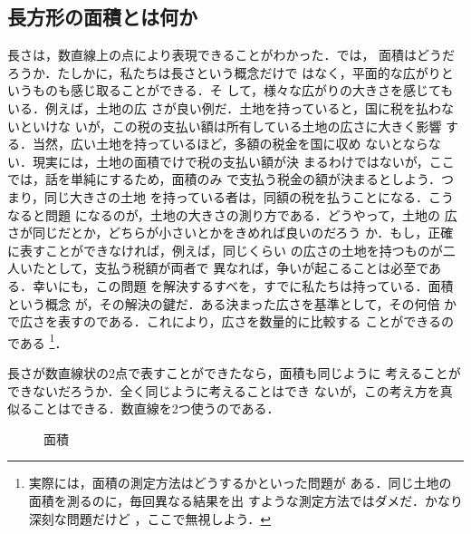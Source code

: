             \subsection{長方形の面積とは何か}\label{sunsec:ChouhoukeiNoMensekiToha}
                長さは，数直線上の点により表現できることがわかった．では，
                面積はどうだろうか．たしかに，私たちは長さという概念だけで
                はなく，平面的な広がりというものも感じ取ることができる．そ
                して，様々な広がりの大きさを感じてもいる．例えば，土地の広
                さが良い例だ．土地を持っていると，国に税を払わないといけな
                いが，この税の支払い額は所有している土地の広さに大きく影響
                する．当然，広い土地を持っているほど，多額の税金を国に収め
                ないとならない．現実には，土地の面積でけで税の支払い額が決
                まるわけではないが，ここでは，話を単純にするため，面積のみ
                で支払う税金の額が決まるとしよう．つまり，同じ大きさの土地
                を持っている者は，同額の税を払うことになる．こうなると問題
                になるのが，土地の大きさの測り方である．どうやって，土地の
                広さが同じだとか，どちらが小さいとかをきめれば良いのだろう
                か．もし，正確に表すことができなければ，例えば，同じくらい
                の広さの土地を持つものが二人いたとして，支払う税額が両者で
                異なれば，争いが起こることは必至である．幸いにも，この問題
                を解決するすべを，すでに私たちは持っている．面積という概念
                が，その解決の鍵だ．ある決まった広さを基準として，その何倍
                かで広さを表すのである．これにより，広さを数量的に比較する
                ことができるのである
                    \footnote{
                        実際には，面積の測定方法はどうするかといった問題が
                        ある．同じ土地の面積を測るのに，毎回異なる結果を出
                        すような測定方法ではダメだ．かなり深刻な問題だけど
                        ，ここで無視しよう．
                    }．

                長さが数直線状の2点で表すことができたなら，面積も同じように
                考えることができないだろうか．全く同じように考えることはでき
                ないが，この考え方を真似ることはできる．数直線を2つ使うのである．
                    \begin{figure}[hbt]
                        \begin{center}
                            \caption{面積}
                            \label{fig:Menseki00}
                        \end{center}
                    \end{figure}

